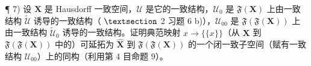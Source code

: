 ¶ 7) 设 \(\mathbf{X}\) 是 Hausdorff 一致空间，\(\mathcal{U}\) 是它的一致结构，\(\mathcal{U}_0\) 是 \(\mathfrak{F}(\mathbf{X})\) 上由一致结构 \(\tilde{\mathcal{U}}\) 诱导的一致结构（ \(\S\) 2 习题 6 b)），\(\mathcal{U}_{00}\) 是 \(\mathfrak{F}(\mathfrak{F}(\mathbf{X}))\) 上由一致结构 \(\tilde{\mathcal{U}}_0\) 诱导的一致结构。证明典范映射 \(x \to \{\{x\}\}\)（从 \(\mathbf{X}\) 到 \(\mathfrak{F}(\mathfrak{F}(\mathbf{X}))\) 中的）可延拓为 \(\hat{\mathbf{X}}\) 到 \(\mathfrak{F}(\mathfrak{F}(\mathbf{X}))\) 的一个闭一致子空间（赋有一致结构 \(\mathcal{U}_{00}\)）上的同构（利用第 4 目命题 9）。

